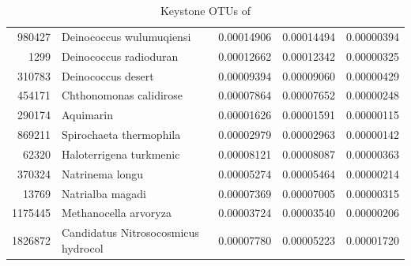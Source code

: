 \documentclass{article}
\begin{document}
\begin{table}[ht]
\begin{tabular}{rlrrr}
  980427 & Deinococcus wulumuqiensi & 0.00014906 & 0.00014494 & 0.00000394 \\ 
  1299 & Deinococcus radioduran & 0.00012662 & 0.00012342 & 0.00000325 \\ 
  310783 & Deinococcus desert & 0.00009394 & 0.00009060 & 0.00000429 \\ 
  454171 & Chthonomonas calidirose & 0.00007864 & 0.00007652 & 0.00000248 \\ 
  290174 & Aquimarin  & 0.00001626 & 0.00001591 & 0.00000115 \\ 
  869211 & Spirochaeta thermophila & 0.00002979 & 0.00002963 & 0.00000142 \\ 
  62320 & Haloterrigena turkmenic & 0.00008121 & 0.00008087 & 0.00000363 \\ 
  370324 & Natrinema longu & 0.00005274 & 0.00005464 & 0.00000214 \\ 
  13769 & Natrialba magadi & 0.00007369 & 0.00007005 & 0.00000315 \\ 
  1175445 & Methanocella arvoryza & 0.00003724 & 0.00003540 & 0.00000206 \\ 
  1826872 & Candidatus Nitrosocosmicus hydrocol & 0.00007780 & 0.00005223 & 0.00001720 \\ 
   \hline
\end{tabular}
\caption{Keystone OTUs of } 
\end{table}
\end{document}
